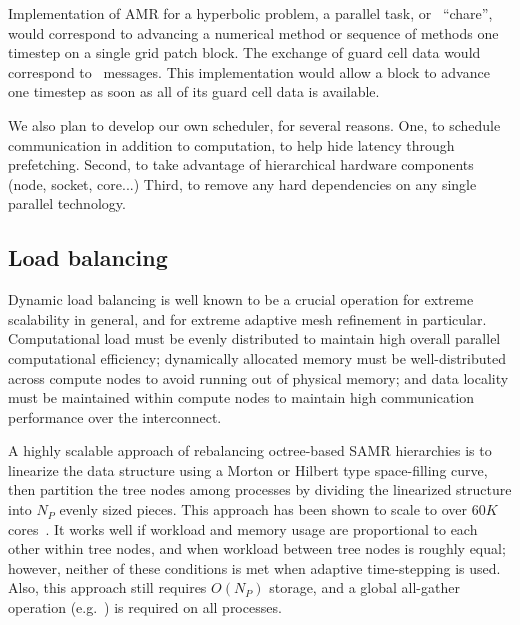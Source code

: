\documentclass{article}
\begin{document}
Implementation of AMR for a hyperbolic problem, a parallel task, or
\charm\  ``chare'', would correspond to advancing a numerical method or
sequence of methods one timestep on a single grid patch block.  The
exchange of guard cell data would correspond to \charm\  messages.
This implementation would allow a block to advance one timestep as
soon as all of its guard cell data is available.


We also plan to develop our own scheduler, for several reasons.  One,
to schedule communication in addition to computation, to help hide
latency through prefetching.  Second, to take advantage of
hierarchical hardware components (node, socket, core...)  Third, to
remove any hard dependencies on any single parallel technology.

\subsection{Load balancing} \label{ss:design-balancing}

Dynamic load balancing is well known to be a crucial operation for
extreme scalability in general, and for extreme adaptive mesh
refinement in particular.  Computational load must be evenly
distributed to maintain high overall parallel computational
efficiency; dynamically allocated memory must be well-distributed
across compute nodes to avoid running out of physical memory; and data
locality must be maintained within compute nodes to maintain high
communication performance over the interconnect.

A highly scalable approach of rebalancing octree-based SAMR
hierarchies is to linearize the data structure using a Morton or
Hilbert type space-filling curve, then partition the tree nodes among
processes by dividing the linearized structure into $N_P$ evenly sized
pieces.  This approach has been shown to scale to over $60K$
cores~\cite{@@@ART}.  It works well if workload and memory usage are
proportional to each other within tree nodes, and when workload
between tree nodes is roughly equal; however, neither of these
conditions is met when adaptive time-stepping is used.  Also, this
approach still requires $O(N_P)$ storage, and a global all-gather
operation (e.g.~) is required on all processes.
\end{document}
